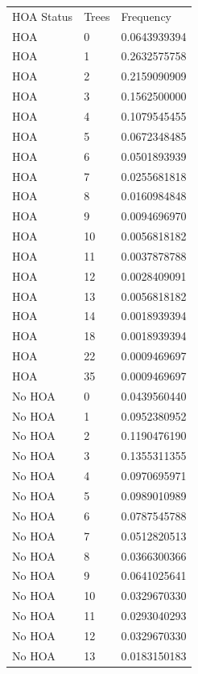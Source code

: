 \documentclass{article}
\begin{document}
\newpage
\begin{table}[p]
\begin{tabular}{lll}
HOA Status & Trees & Frequency    \\
HOA        & 0     & 0.0643939394 \\
HOA        & 1     & 0.2632575758 \\
HOA        & 2     & 0.2159090909 \\
HOA        & 3     & 0.1562500000 \\
HOA        & 4     & 0.1079545455 \\
HOA        & 5     & 0.0672348485 \\
HOA        & 6     & 0.0501893939 \\
HOA        & 7     & 0.0255681818 \\
HOA        & 8     & 0.0160984848 \\
HOA        & 9     & 0.0094696970 \\
HOA        & 10    & 0.0056818182 \\
HOA        & 11    & 0.0037878788 \\
HOA        & 12    & 0.0028409091 \\
HOA        & 13    & 0.0056818182 \\
HOA        & 14    & 0.0018939394 \\
HOA        & 18    & 0.0018939394 \\
HOA        & 22    & 0.0009469697 \\
HOA        & 35    & 0.0009469697 \\
No HOA     & 0     & 0.0439560440 \\
No HOA     & 1     & 0.0952380952 \\
No HOA     & 2     & 0.1190476190 \\
No HOA     & 3     & 0.1355311355 \\
No HOA     & 4     & 0.0970695971 \\
No HOA     & 5     & 0.0989010989 \\
No HOA     & 6     & 0.0787545788 \\
No HOA     & 7     & 0.0512820513 \\
No HOA     & 8     & 0.0366300366 \\
No HOA     & 9     & 0.0641025641 \\
No HOA     & 10    & 0.0329670330 \\
No HOA     & 11    & 0.0293040293 \\
No HOA     & 12    & 0.0329670330 \\
No HOA     & 13    & 0.0183150183 \\

\end{tabular}
\end{table}
\end{document}
